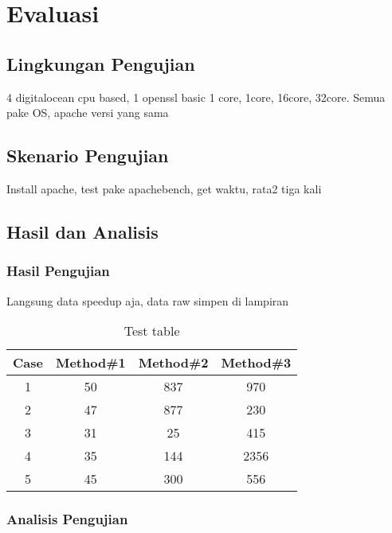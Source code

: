
\section{Evaluasi}
\subsection{Lingkungan Pengujian}
4 digitalocean cpu based, 1 openssl basic 1 core, 1core, 16core, 32core. Semua pake OS, apache versi yang sama
\subsection{Skenario Pengujian}
Install apache, test pake apachebench, get waktu, rata2 tiga kali
\subsection{Hasil dan Analisis}
\subsubsection{Hasil Pengujian}
  Langsung data speedup aja, data raw simpen di lampiran

  \begin{table}[ht]
  \caption{Test table} %
  \centering %
  \begin{tabular}{c c c c} %
  \hline\hline %
  Case & Method\#1 & Method\#2 & Method\#3 \\ [0.5ex] %
  \hline %
  1 & 50 & 837 & 970 \\ %
  2 & 47 & 877 & 230 \\
  3 & 31 & 25 & 415 \\
  4 & 35 & 144 & 2356 \\
  5 & 45 & 300 & 556 \\ [1ex] %
  \hline %
  \end{tabular}
  \label{table:nonlin} %
  \end{table}

\subsubsection{Analisis Pengujian}
